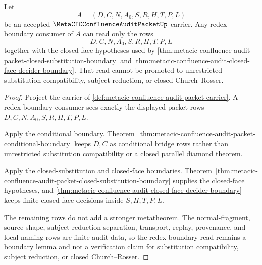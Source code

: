 \begin{theorem}
\label{thm:metacic-confluence-audit-redex-boundary}
Let
$$
A=(D,C,N,A_0,S,R,H,T,P,L)
$$
be an accepted $\MetaCICConfluenceAuditPacketUp$ carrier. Any redex-boundary consumer of $A$ can read only the rows
$$
D,C,N,A_0,S,R,H,T,P,L
$$
together with the closed-face hypotheses used by \autoref{thm:metacic-confluence-audit-packet-closed-substitution-boundary} and \autoref{thm:metacic-confluence-audit-closed-face-decider-boundary}. That read cannot be promoted to unrestricted substitution compatibility, subject reduction, or closed Church--Rosser.
\end{theorem}
\begin{proof}
Project the carrier of \autoref{def:metacic-confluence-audit-packet-carrier}. A redex-boundary consumer sees exactly the displayed packet rows $D,C,N,A_0,S,R,H,T,P,L$.

Apply the conditional boundary. Theorem~\ref{thm:metacic-confluence-audit-packet-conditional-boundary} keeps $D,C$ as conditional bridge rows rather than unrestricted substitution compatibility or a closed parallel diamond theorem.

Apply the closed-substitution and closed-face boundaries. Theorem~\ref{thm:metacic-confluence-audit-packet-closed-substitution-boundary} supplies the closed-face hypotheses, and \autoref{thm:metacic-confluence-audit-closed-face-decider-boundary} keeps finite closed-face decisions inside $S,H,T,P,L$.

The remaining rows do not add a stronger metatheorem. The normal-fragment, source-shape, subject-reduction separation, transport, replay, provenance, and local naming rows are finite audit data, so the redex-boundary read remains a boundary lemma and not a verification claim for substitution compatibility, subject reduction, or closed Church--Rosser.
\end{proof}


